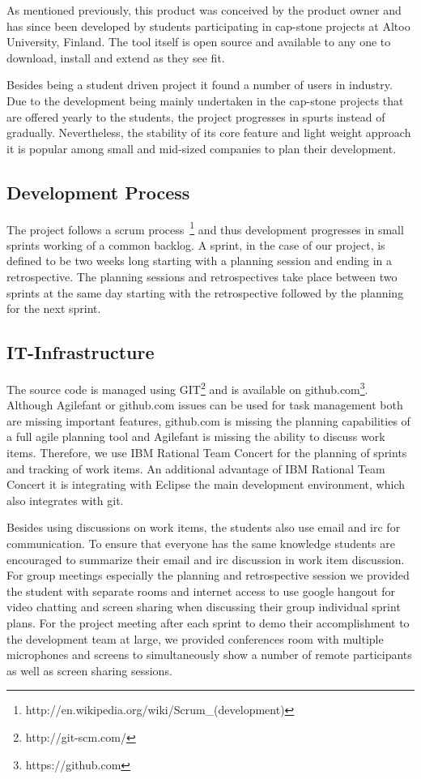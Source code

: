 As mentioned previously, this product was conceived by the product owner and has since been developed by students participating in cap-stone projects at Altoo University, Finland.
The tool itself is open source and available to any one to download, install and extend as they see fit.

Besides being a student driven project it found a number of users in industry.
Due to the development being mainly undertaken in the cap-stone projects that are offered yearly to the students, the project progresses in spurts instead of gradually.
Nevertheless, the stability of its core feature and light weight approach it is popular among small and mid-sized companies to plan their development.

\subsection{Development Process}
The project follows a scrum process~\footnote{http://en.wikipedia.org/wiki/Scrum\_(development)} and thus development progresses in small sprints working of a common backlog.
A sprint, in the case of our project, is defined to be two weeks long starting with a planning session and ending in a retrospective.
The planning sessions and retrospectives take place between two sprints at the same day starting with the retrospective followed by the planning for the next sprint.

\subsection{IT-Infrastructure}
The source code is managed using GIT\footnote{http://git-scm.com/} and is available on github.com\footnote{https://github.com}.
Although Agilefant or github.com issues can be used for task management both are missing important features, github.com is missing the planning capabilities of a full agile planning tool and Agilefant is missing the ability to discuss work items.
Therefore, we use IBM Rational Team Concert for the planning of sprints and tracking of work items.
An additional advantage of IBM Rational Team Concert it is integrating with Eclipse the main development environment, which also integrates with git. 

Besides using discussions on work items, the students also use email and irc for communication.
To ensure that everyone has the same knowledge students are encouraged to summarize their email and irc discussion in work item discussion.
For group meetings especially the planning and retrospective session we provided the student with separate rooms and internet access to use google hangout for video chatting and screen sharing when discussing their group individual sprint plans.
For the project meeting after each sprint to demo their accomplishment to the development team at large, we provided conferences room with multiple microphones and screens to simultaneously show a number of remote participants as well as screen sharing sessions. 

